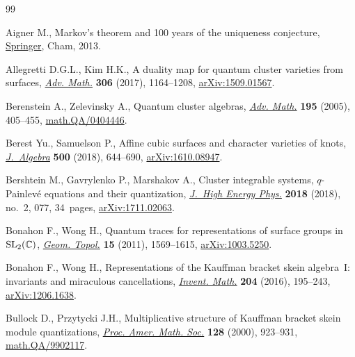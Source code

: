 \begin{thebibliography}{99}
\footnotesize\itemsep=0pt

Aigner M., Markov's theorem and 100 years of the uniqueness conjecture,
 \href{https://doi.org/10.1007/978-3-319-00888-2}{Springer}, Cham, 2013.

Allegretti D.G.L., Kim H.K., A duality map for quantum cluster varieties from
 surfaces, \href{https://doi.org/10.1016/j.aim.2016.11.007}{\textit{Adv. Math.}} \textbf{306} (2017), 1164--1208,
 \href{https://arxiv.org/abs/1509.01567}{arXiv:1509.01567}.

Berenstein A., Zelevinsky A., Quantum cluster algebras, \href{https://doi.org/10.1016/j.aim.2004.08.003}{\textit{Adv. Math.}}
 \textbf{195} (2005), 405--455, \href{https://arxiv.org/abs/math.QA/0404446}{math.QA/0404446}.

Berest Yu., Samuelson P., Affine cubic surfaces and character varieties of
 knots, \href{https://doi.org/10.1016/j.jalgebra.2017.11.015}{\textit{J.~Algebra}} \textbf{500} (2018), 644--690,
 \href{https://arxiv.org/abs/1610.08947}{arXiv:1610.08947}.

Bershtein M., Gavrylenko P., Marshakov A., Cluster integrable systems,
 {$q$}-{P}ainlev\'{e} equations and their quantization, \href{https://doi.org/10.1007/jhep02(2018)077}{\textit{J.~High Energy
 Phys.}} \textbf{2018} (2018), no.~2, 077, 34~pages, \href{https://arxiv.org/abs/1711.02063}{arXiv:1711.02063}.

Bonahon F., Wong H., Quantum traces for representations of surface groups in
 {${\rm SL}_2(\mathbb C)$}, \href{https://doi.org/10.2140/gt.2011.15.1569}{\textit{Geom. Topol.}} \textbf{15} (2011),
 1569--1615, \href{https://arxiv.org/abs/1003.5250}{arXiv:1003.5250}.

Bonahon F., Wong H., Representations of the {K}auffman bracket skein
 algebra~{I}: invariants and miraculous cancellations, \href{https://doi.org/10.1007/s00222-015-0611-y}{\textit{Invent. Math.}}
 \textbf{204} (2016), 195--243, \href{https://arxiv.org/abs/1206.1638}{arXiv:1206.1638}.

Bullock D., Przytycki J.H., Multiplicative structure of {K}auffman bracket
 skein module quantizations, \href{https://doi.org/10.1090/S0002-9939-99-05043-1}{\textit{Proc. Amer. Math. Soc.}} \textbf{128}
 (2000), 923--931, \href{https://arxiv.org/abs/math.QA/9902117}{math.QA/9902117}.


\end{thebibliography}
